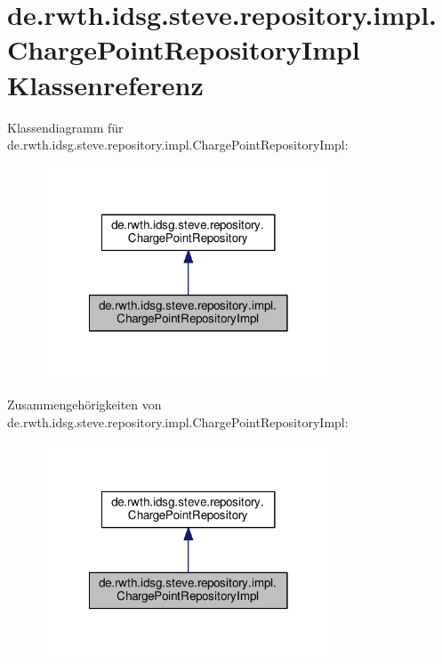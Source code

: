 \hypertarget{classde_1_1rwth_1_1idsg_1_1steve_1_1repository_1_1impl_1_1_charge_point_repository_impl}{\section{de.\-rwth.\-idsg.\-steve.\-repository.\-impl.\-Charge\-Point\-Repository\-Impl Klassenreferenz}
\label{classde_1_1rwth_1_1idsg_1_1steve_1_1repository_1_1impl_1_1_charge_point_repository_impl}
}


Klassendiagramm für de.\-rwth.\-idsg.\-steve.\-repository.\-impl.\-Charge\-Point\-Repository\-Impl\-:\nopagebreak
\begin{figure}[H]
\begin{center}
\leavevmode
\includegraphics[width=246pt]{classde_1_1rwth_1_1idsg_1_1steve_1_1repository_1_1impl_1_1_charge_point_repository_impl__inherit__graph}
\end{center}
\end{figure}


Zusammengehörigkeiten von de.\-rwth.\-idsg.\-steve.\-repository.\-impl.\-Charge\-Point\-Repository\-Impl\-:\nopagebreak
\begin{figure}[H]
\begin{center}
\leavevmode
\includegraphics[width=246pt]{classde_1_1rwth_1_1idsg_1_1steve_1_1repository_1_1impl_1_1_charge_point_repository_impl__coll__graph}
\end{center}
\end{figure}
